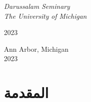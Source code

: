 \documentclass[11pt,twoside]{book}
\begin{document}
\begin{titlepage}
	\vspace{0.5\baselineskip} %
	
	\textit{\textenglish{Darussalam Seminary \\ The University of Michigan}} %
	
	\vfill %
	
	
	
	\vspace{0.3\baselineskip} %
	
	\textenglish{2023} %
	

\end{titlepage}

\thispagestyle{empty} %
\vspace*{\fill}
\begin{center}

\vspace{10mm}

\itshape{}

\vspace{10mm}

\textenglish{Ann Arbor, Michigan}\\
\textenglish{2023}

\end{center}
\vspace*{\fill}

\clearpage

\thispagestyle{empty}
\tableofcontents
\thispagestyle{empty}
\pagebreak
\thispagestyle{empty}
\listoffigures
\listoftables

\mainmatter

\chapter{المقدمة}

\end{document}
